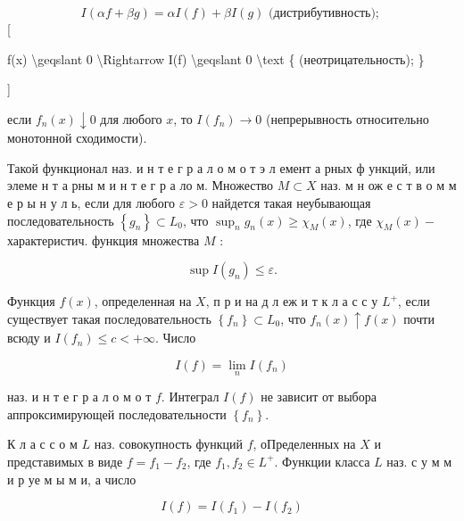 \documentclass[10pt]{article}
\begin{document}
\[

I(\alpha f+\beta g)=\alpha I(f)+\beta I(g) \text { (дистрибутивность); }

\][



f(x) \textbackslash geqslant 0 \textbackslash Rightarrow I(f) \textbackslash geqslant 0 \textbackslash text \{ (неотрицательность); \}

]



если $f_{n}(x) \downarrow 0$ для любого $x$, то $I\left(f_{n}\right) \rightarrow 0$ (непрерывность относительно монотонной сходимости).



Такой функционал наз. и н т е г р а л о м о т э л емент а рных ф ункций, или элеме н т а рны м и н т е г р а ло м. Множество $M \subset X$ наз. м н ож е с т в о м м е р ы н у л ь, если для любого $\varepsilon>0$ найдется такая неубывающая последовательность $\left\{g_{n}\right\} \subset L_{0}$, что $\sup _{n} g_{n}(x) \geqslant \chi_{M}(x)$, где $\chi_{M}(x)-$ характеристич. функция множества $M$ :



\[

\sup I\left(g_{n}\right) \leqslant \varepsilon .

\]



Функция $f(x)$, определенная на $X$, п р и на д л еж и т к л а с с у $L^{+}$, если существует такая последовательность $\left\{f_{n}\right\} \subset L_{0}$, что $f_{n}(x) \uparrow f(x)$ почти всюду и $I\left(f_{n}\right) \leqslant c<+\infty$. Число



\[

I(f)=\lim _{n} I\left(f_{n}\right)

\]



наз. и н т е г р а л о м о т $f$. Интеграл $I(f)$ не зависит от выбора аппроксимирующей последовательности $\left\{f_{n}\right\}$.



К л а с с о м $L$ наз. совокупность функций $f$, оПределенных на $X$ и представимых в виде $f=f_{1}-f_{2}$, где $f_{1}, f_{2} \in L^{+}$. Функции класса $L$ наз. с у м м и р уе м ы м и, а число



\[

I(f)=I\left(f_{1}\right)-I\left(f_{2}\right)

\]
\end{document}
